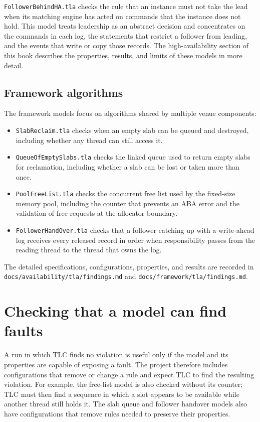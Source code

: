 \texttt{FollowerBehindHA.tla} checks the rule that an instance must not take the lead when
its matching engine has acted on commands that the instance does not hold. This model
treats leadership as an abstract decision and concentrates on the commands in each log,
the statements that restrict a follower from leading, and the events that write or copy
those records. The high-availability section of this book describes the properties,
results, and limits of these models in more detail.

\subsection{Framework algorithms}

The framework models focus on algorithms shared by multiple venue components:

\begin{itemize}
  \item \texttt{SlabReclaim.tla} checks when an empty slab can be queued and destroyed,
  including whether any thread can still access it.
  \item \texttt{QueueOfEmptySlabs.tla} checks the linked queue used to return empty slabs
  for reclamation, including whether a slab can be lost or taken more than once.
  \item \texttt{PoolFreeList.tla} checks the concurrent free list used by the fixed-size
  memory pool, including the counter that prevents an ABA error and the validation of
  free requests at the allocator boundary.
  \item \texttt{FollowerHandOver.tla} checks that a follower catching up with a
  write-ahead log receives every released record in order when responsibility passes
  from the reading thread to the thread that owns the log.
\end{itemize}

The detailed specifications, configurations, properties, and results are recorded in
\texttt{docs/availability/tla/findings.md} and
\texttt{docs/framework/tla/findings.md}.

\section{Checking that a model can find faults}

A run in which TLC finds no violation is useful only if the model and its properties are
capable of exposing a fault. The project therefore includes configurations that remove or
change a rule and expect TLC to find the resulting violation. For example, the free-list
model is also checked without its counter; TLC must then find a sequence in which a slot
appears to be available while another thread still holds it. The slab queue and follower
handover models also have configurations that remove rules needed to preserve their
properties.

